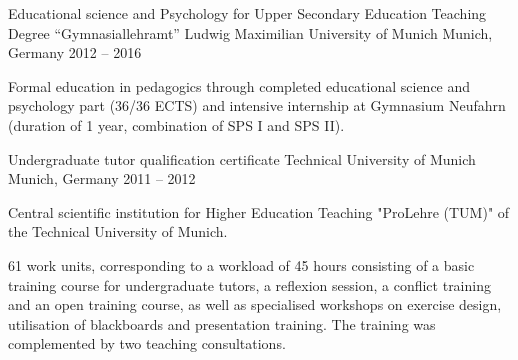 



\begin{cventries}

      \cventry
      {Educational science and Psychology for Upper Secondary Education Teaching Degree   “Gymnasiallehramt”} %
      {Ludwig Maximilian University of Munich} %
      {Munich, Germany} %
      {2012 -- 2016} %
      {
        \begin{cvitems} %
          \item {Formal education in pedagogics through completed educational science and psychology part (36/36 ECTS) and in­ten­si­ve in­ternship at Gymnasium Neufahrn (duration of 1 year, com­bi­na­ti­on of SPS I and SPS II).}
        \end{cvitems}
      }
  
    \cventry
      {Undergraduate tutor qualification certificate} %
      {Technical University of Munich} %
      {Munich, Germany} %
      {2011 -- 2012} %
      {
        \begin{cvitems} %
          \item {Central scientific institution for Higher Education Teaching "ProLehre (TUM)" of the Technical University of Munich.}
          \item{61 work units, corresponding to a workload of 45 hours consisting of a
          basic training course for undergraduate tutors, a reflexion session, a conflict training and an open training course, as well as specialised workshops on exercise design, utilisation of blackboards and presentation training. The training was complemented by two teaching consultations.}
        \end{cvitems}
      }
  \end{cventries}
  
  

